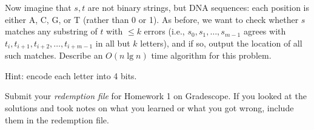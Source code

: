 \begin{qunlist}
\begin{qparts}
\item Now imagine that $s,t$ are not binary strings, but DNA sequences:
each position is either A, C, G, or T (rather than 0 or 1).
As before, we want to check whether $s$ matches any substring of $t$
with $\le k$ errors
(i.e., $s_0,s_1,\dots,s_{m-1}$ agrees with
$t_i,t_{i+1},t_{i+2},\dots,t_{i+m-1}$ in all but $k$ letters),
and if so, output the location of all such matches.
Describe an $O(n \lg n)$ time algorithm for this problem.

Hint: encode each letter into 4 bits.


\end{qparts}


\pagebreak
{}

Submit your \emph{redemption file} for Homework 1 on Gradescope. If you looked at the solutions and took notes on what you learned or what you got wrong, include them in the redemption file. 


\end{qunlist}
